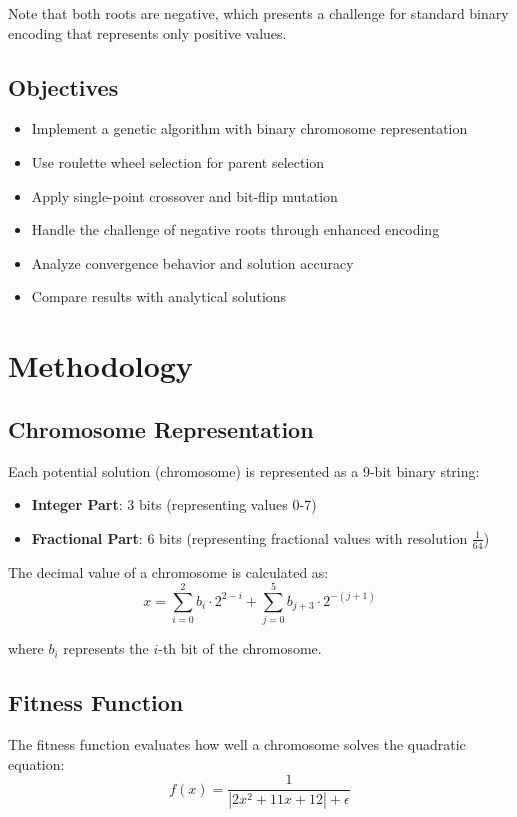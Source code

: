 \documentclass[11pt,a4paper]{article}
\begin{document}
Note that both roots are negative, which presents a challenge for standard binary encoding that represents only positive values.

\subsection{Objectives}
\begin{itemize}
    \item Implement a genetic algorithm with binary chromosome representation
    \item Use roulette wheel selection for parent selection
    \item Apply single-point crossover and bit-flip mutation
    \item Handle the challenge of negative roots through enhanced encoding
    \item Analyze convergence behavior and solution accuracy
    \item Compare results with analytical solutions
\end{itemize}

\section{Methodology}

\subsection{Chromosome Representation}
Each potential solution (chromosome) is represented as a 9-bit binary string:
\begin{itemize}
    \item \textbf{Integer Part}: 3 bits (representing values 0-7)
    \item \textbf{Fractional Part}: 6 bits (representing fractional values with resolution $\frac{1}{64}$)
\end{itemize}

The decimal value of a chromosome is calculated as:
\begin{equation}
x = \sum_{i=0}^{2} b_i \cdot 2^{2-i} + \sum_{j=0}^{5} b_{j+3} \cdot 2^{-(j+1)}
\end{equation}

where $b_i$ represents the $i$-th bit of the chromosome.

\subsection{Fitness Function}
The fitness function evaluates how well a chromosome solves the quadratic equation:
\begin{equation}
f(x) = \frac{1}{|2x^2 + 11x + 12| + \epsilon}
\end{equation}
\end{document}

